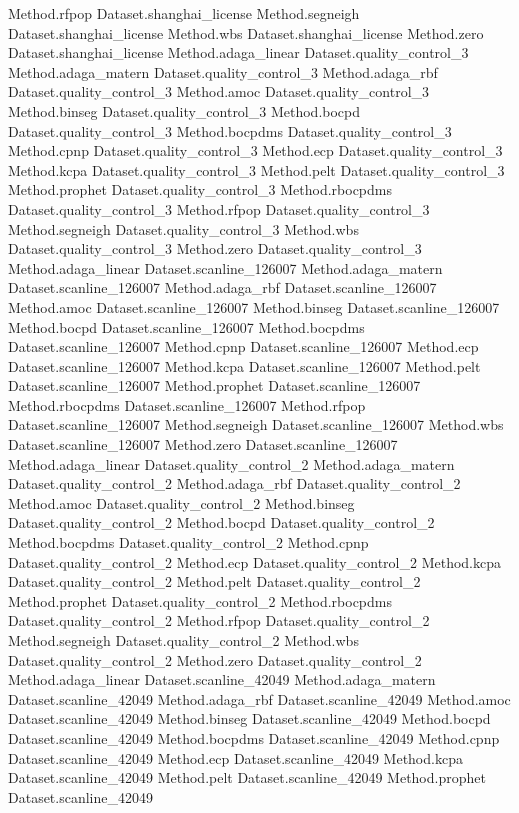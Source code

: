 Method.rfpop Dataset.shanghai_license
Method.segneigh Dataset.shanghai_license
Method.wbs Dataset.shanghai_license
Method.zero Dataset.shanghai_license
Method.adaga_linear Dataset.quality_control_3
Method.adaga_matern Dataset.quality_control_3
Method.adaga_rbf Dataset.quality_control_3
Method.amoc Dataset.quality_control_3
Method.binseg Dataset.quality_control_3
Method.bocpd Dataset.quality_control_3
Method.bocpdms Dataset.quality_control_3
Method.cpnp Dataset.quality_control_3
Method.ecp Dataset.quality_control_3
Method.kcpa Dataset.quality_control_3
Method.pelt Dataset.quality_control_3
Method.prophet Dataset.quality_control_3
Method.rbocpdms Dataset.quality_control_3
Method.rfpop Dataset.quality_control_3
Method.segneigh Dataset.quality_control_3
Method.wbs Dataset.quality_control_3
Method.zero Dataset.quality_control_3
Method.adaga_linear Dataset.scanline_126007
Method.adaga_matern Dataset.scanline_126007
Method.adaga_rbf Dataset.scanline_126007
Method.amoc Dataset.scanline_126007
Method.binseg Dataset.scanline_126007
Method.bocpd Dataset.scanline_126007
Method.bocpdms Dataset.scanline_126007
Method.cpnp Dataset.scanline_126007
Method.ecp Dataset.scanline_126007
Method.kcpa Dataset.scanline_126007
Method.pelt Dataset.scanline_126007
Method.prophet Dataset.scanline_126007
Method.rbocpdms Dataset.scanline_126007
Method.rfpop Dataset.scanline_126007
Method.segneigh Dataset.scanline_126007
Method.wbs Dataset.scanline_126007
Method.zero Dataset.scanline_126007
Method.adaga_linear Dataset.quality_control_2
Method.adaga_matern Dataset.quality_control_2
Method.adaga_rbf Dataset.quality_control_2
Method.amoc Dataset.quality_control_2
Method.binseg Dataset.quality_control_2
Method.bocpd Dataset.quality_control_2
Method.bocpdms Dataset.quality_control_2
Method.cpnp Dataset.quality_control_2
Method.ecp Dataset.quality_control_2
Method.kcpa Dataset.quality_control_2
Method.pelt Dataset.quality_control_2
Method.prophet Dataset.quality_control_2
Method.rbocpdms Dataset.quality_control_2
Method.rfpop Dataset.quality_control_2
Method.segneigh Dataset.quality_control_2
Method.wbs Dataset.quality_control_2
Method.zero Dataset.quality_control_2
Method.adaga_linear Dataset.scanline_42049
Method.adaga_matern Dataset.scanline_42049
Method.adaga_rbf Dataset.scanline_42049
Method.amoc Dataset.scanline_42049
Method.binseg Dataset.scanline_42049
Method.bocpd Dataset.scanline_42049
Method.bocpdms Dataset.scanline_42049
Method.cpnp Dataset.scanline_42049
Method.ecp Dataset.scanline_42049
Method.kcpa Dataset.scanline_42049
Method.pelt Dataset.scanline_42049
Method.prophet Dataset.scanline_42049
